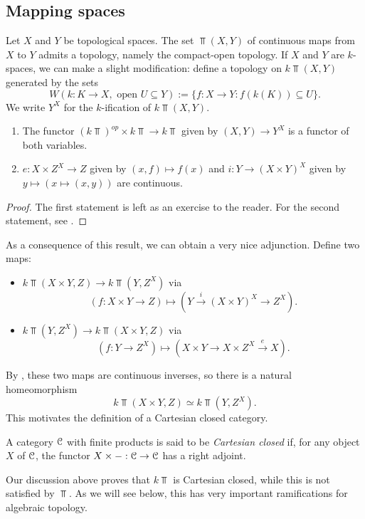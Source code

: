 \subsection{Mapping spaces}\label{mappingspaces}
Let $X$ and $Y$ be topological spaces.
The set $\Top(X,Y)$ of continuous maps from $X$ to $Y$ admits a topology, namely the compact-open topology.
If $X$ and $Y$ are $k$-spaces, we can make a slight modification:
define a topology on $k\Top(X,Y)$ generated by the sets
$$W(k:K\to X, \text{ open }U\subseteq Y) := \{f:X\to Y: f(k(K))\subseteq U\}.$$
We write $Y^X$ for the $k$-ification of $k\Top(X,Y)$.
\begin{prop}
    \begin{enumerate}
	\item The functor $(k\Top)^{op}\times k\Top\to k\Top$ given by $(X,Y)\to Y^X$ is a functor of both variables.
	\item $e:X\times Z^X\to Z$ given by $(x,f)\mapsto f(x)$ and $i:Y\to (X\times Y)^X$ given by $y\mapsto(x\mapsto(x,y))$ are continuous.
    \end{enumerate}
\end{prop}
\begin{proof}
    The first statement is left as an exercise to the reader.
    For the second statement, see \cite[Proposition 2.11]{StricklandCGWH}.
\end{proof}
As a consequence of this result, we can obtain a very nice adjunction.
Define two maps:
\begin{itemize}
    \item $k\Top(X\times Y,Z)\to k\Top(Y,Z^X)$ via
	$$(f:X\times Y\to Z)\mapsto (Y\xrightarrow{i}(X\times Y)^X\to Z^X).$$
    \item $k\Top(Y,Z^X) \to k\Top(X\times Y,Z)$ via
	$$(f:Y\to Z^X)\mapsto(X\times Y\to X\times Z^X\xrightarrow{e} X).$$
\end{itemize}
By \cite[Proposition 2.12]{StricklandCGWH}, these two maps are continuous inverses, so there is a natural homeomorphism
$$k\Top(X\times Y,Z)\simeq k\Top(Y,Z^X).$$
This motivates the definition of a {Cartesian closed} category.
\begin{definition}\label{cartesian-closed}
    A category $\mathcal C$ with finite products is said to be
    \emph{Cartesian closed} if, for any object $X$ of $\mathcal C$, the functor $X\times -:\mathcal C\to \mathcal C$ has a right adjoint.
\end{definition}
Our discussion above proves that $k\Top$ is Cartesian closed, while this is not satisfied by $\Top$.
As we will see below, this has very important ramifications for algebraic topology.
\begin{exercise}
\end{exercise}
